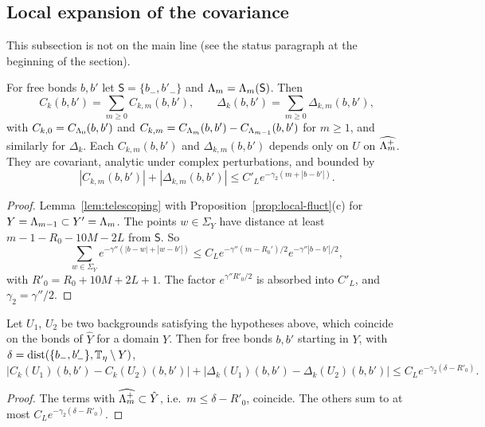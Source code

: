 \subsection{Local expansion of the covariance}\label{subsec:local-cov-expansion}

This subsection is not on the main line (see the status paragraph at the beginning of the section).

\begin{theorem}\label{thm:local-covariance}
For free bonds $b,b'$ let $\mathsf S=\{b_-,b'_-\}$ and $\Lambda_m=\Lambda_m(\mathsf S)$. Then
\[
C_k(b,b')=\sum_{m\ge0}C_{k,m}(b,b'),\qquad\Delta_k(b,b')=\sum_{m\ge0}\Delta_{k,m}(b,b'),
\]
with $C_{k,0}=C_{\Lambda_0}(b,b')$ and $C_{k,m}=C_{\Lambda_m}(b,b')-C_{\Lambda_{m-1}}(b,b')$ for $m\ge1$, and similarly for $\Delta_k$. Each $C_{k,m}(b,b')$ and $\Delta_{k,m}(b,b')$ depends only on $U$ on $\widehat{\Lambda_m^+}$. They are covariant, analytic under complex perturbations, and bounded by
\[
|C_{k,m}(b,b')|+|\Delta_{k,m}(b,b')|\le C'_Le^{-\gamma_2(m+|b-b'|)} .
\]
\end{theorem}

\begin{proof}
Lemma~\ref{lem:telescoping} with Proposition~\ref{prop:local-fluct}(c) for $Y=\Lambda_{m-1}\subset Y'=\Lambda_m$. The points $w\in\Sigma_Y$ have distance at least $m-1-R_0-10M-2L$ from $\mathsf S$. So
\[
\sum_{w\in\Sigma_Y}e^{-\gamma''(|b-w|+|w-b'|)}\le C_Le^{-\gamma''(m-R_0')/2}e^{-\gamma''|b-b'|/2},
\]
with $R'_0=R_0+10M+2L+1$. The factor $e^{\gamma''R'_0/2}$ is absorbed into $C'_L$, and $\gamma_2=\gamma''/2$.
\end{proof}

\begin{corollary}\label{cor:large-changes}
Let $U_1$, $U_2$ be two backgrounds satisfying the hypotheses above, which coincide on the bonds of $\hat Y$ for a domain $Y$. Then for free bonds $b,b'$ starting in $Y$, with $\delta=\operatorname{dist}(\{b_-,b'_-\},\mathbb T_\eta\setminus Y)$,
\[
|C_k(U_1)(b,b')-C_k(U_2)(b,b')|+|\Delta_k(U_1)(b,b')-\Delta_k(U_2)(b,b')|\le C_Le^{-\gamma_2(\delta-R'_0)} .
\]
\end{corollary}

\begin{proof}
The terms with $\widehat{\Lambda_m^+}\subset\hat Y$, i.e.\ $m\le\delta-R'_0$, coincide. The others sum to at most $C_Le^{-\gamma_2(\delta-R'_0)}$.
\end{proof}

